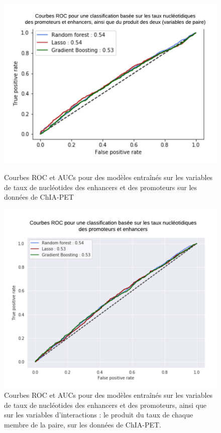 \documentclass[french]{llncs}
\begin{document}
\begin{figure}[!htb]
    \centering
    \begin{minipage}[t]{.5\textwidth}
        \centering
        \includegraphics[width=1\linewidth]{Images_FANTOM/rocs_chia_simple.png}
        \caption{Courbes ROC et AUCs pour des modèles entraînés sur les variables de taux de nucléotides des enhancers et des promoteurs sur les données de ChIA-PET}
        \label{fig:rocs_chia_simple}
    \end{minipage}%
    \begin{minipage}[t]{.5\textwidth}
        \centering
        \includegraphics[width=0.9\linewidth]{Images_FANTOM/rocs_chia_inter.png}
        \caption{Courbes ROC et AUCs pour des modèles entraînés sur les variables de taux de nucléotides des enhancers et des promoteurs, ainsi que sur les variables d'interactions : le produit du taux de chaque membre de la paire, sur les données de ChIA-PET.}
        \label{fig:rocs_chia_int}
    \end{minipage}
\end{figure}
\end{document}
